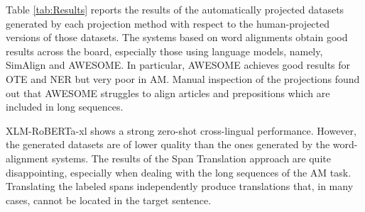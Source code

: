 \documentclass[11pt]{article}
\begin{document}
\begin{table*}[htb]
    \centering
    \caption{F1 scores for annotation projection in the OTE, NER and Argument Mining tasks.}
    \label{tab:Results}
\end{table*}

Table \ref{tab:Results} reports the results of the automatically projected
datasets generated by each projection method with respect to the
human-projected versions of those datasets. The systems based on word
alignments obtain good results across the board, especially those using
language models, namely, SimAlign and AWESOME. In particular, AWESOME achieves
good results for OTE and NER but very poor in AM. Manual
inspection of the projections found out that AWESOME struggles to align
articles and prepositions which are included in long sequences.

XLM-RoBERTa-xl shows a strong zero-shot cross-lingual performance. However, the
generated datasets are of lower quality than the ones generated by the
word-alignment systems. The results of the Span Translation approach are quite
disappointing, especially when dealing with the long sequences of the AM task. 
Translating the labeled spans independently produce translations
that, in many cases, cannot be located in the target sentence. 
\end{document}
